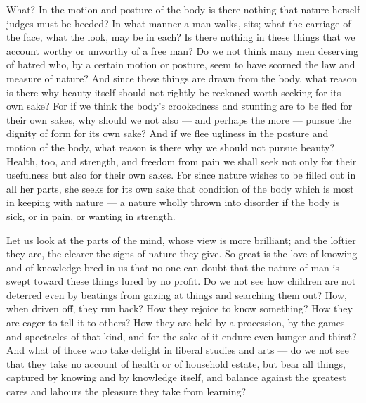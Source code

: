  What? In the motion and posture of the body is there nothing that nature herself judges must be heeded? In what manner a man walks, sits; what the carriage of the face, what the look, may be in each? Is there nothing in these things that we account worthy or unworthy of a free man? Do we not think many men deserving of hatred who, by a certain motion or posture, seem to have scorned the law and measure of nature? And since these things are drawn from the body, what reason is there why beauty itself should not rightly be reckoned worth seeking for its own sake? For if we think the body's crookedness and stunting are to be fled for their own sakes, why should we not also — and perhaps the more — pursue the dignity of form for its own sake? And if we flee ugliness in the posture and motion of the body, what reason is there why we should not pursue beauty? Health, too, and strength, and freedom from pain we shall seek not only for their usefulness but also for their own sakes. For since nature wishes to be filled out in all her parts, she seeks for its own sake that condition of the body which is most in keeping with nature — a nature wholly thrown into disorder if the body is sick, or in pain, or wanting in strength.

 Let us look at the parts of the mind, whose view is more brilliant; and the loftier they are, the clearer the signs of nature they give. So great is the love of knowing and of knowledge bred in us that no one can doubt that the nature of man is swept toward these things lured by no profit. Do we not see how children are not deterred even by beatings from gazing at things and searching them out? How, when driven off, they run back? How they rejoice to know something? How they are eager to tell it to others? How they are held by a procession, by the games and spectacles of that kind, and for the sake of it endure even hunger and thirst? And what of those who take delight in liberal studies and arts — do we not see that they take no account of health or of household estate, but bear all things, captured by knowing and by knowledge itself, and balance against the greatest cares and labours the pleasure they take from learning?

